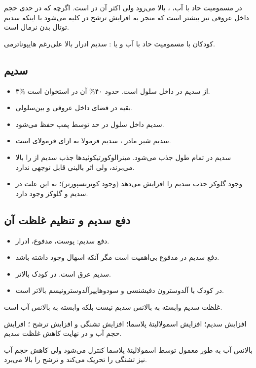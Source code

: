\documentclass[12pt,a4paper]{article}
\begin{document}
در مسمومیت حاد با آب، ،  بالا می‌رود ولی اکثر آن در  است. اگرچه که در حدی حجم داخل عروقی نیز بیشتر است که منجر به افزایش ترشح  در کلیه می‌شود با اینکه سدیم توتال بدن نرمال است.

کودکان با مسمومیت حاد با آب و یا : سدیم ادرار بالا علی‌رغم هایپوناترمی.

\subsection*{سدیم}
\begin{itemize}
\item ۳\% از سدیم در داخل سلول است. حدود ۴۰\% آن در استخوان است.
\item بقیه در فضای داخل عروقی و بین‌سلولی.
\item سدیم داخل سلول در حد  توسط پمپ  حفظ می‌شود.
\item سدیم شیر مادر ، سدیم فرمولا  به ازای فرمولای  است.
\item سدیم در تمام طول  جذب می‌شود. مینرالوکورتیکوئیدها جذب سدیم از  را بالا می‌برند، ولی اثر بالینی قابل توجهی ندارد.
\item وجود گلوکز جذب سدیم را افزایش می‌دهد (وجود کوترنسپورتر)؛ به این علت در  سدیم و گلوکز وجود دارد.
\end{itemize}

\subsection*{دفع سدیم و تنظیم غلظت آن}
\begin{itemize}
\item دفع سدیم: پوست، مدفوع، ادرار.
\item دفع سدیم در مدفوع بی‌اهمیت است مگر آنکه اسهال وجود داشته باشد.
\item سدیم عرق  است. در کودک  بالاتر.
\item در کودک با آلدوسترون دفیشنسی و سودوهایپرآلدوسترونیسم بالاتر است.
\end{itemize}
غلظت سدیم وابسته به بالانس سدیم نیست بلکه وابسته به بالانس آب است.

افزایش سدیم؛ افزایش اسمولالیتهٔ پلاسما؛ افزایش تشنگی و افزایش ترشح ؛ افزایش حجم آب و در نهایت کاهش غلظت سدیم.

بالانس آب به طور معمول توسط اسمولالیتهٔ پلاسما کنترل می‌شود ولی کاهش حجم آب نیز تشنگی را تحریک می‌کند و ترشح  را بالا می‌برد.
\end{document}
